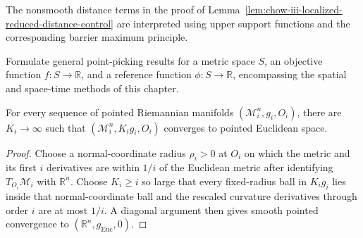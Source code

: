 \begin{remark}
\label{rem:chow-iii-localized-barrier-nonsmoothness}
The nonsmooth distance terms in the proof of
Lemma~\ref{lem:chow-iii-localized-reduced-distance-control} are interpreted
using upper support functions and the corresponding barrier maximum
principle.
\end{remark}

\begin{example}
\label{ex:chow-iii-general-point-picking}
Formulate general point-picking results for a metric space \(S\), an objective
function \(f:S\to\mathbb R\), and a reference function
\(\phi:S\to\mathbb R\), encompassing the spatial and space-time methods of
this chapter.
\end{example}

\begin{example}
\label{ex:chow-iii-trivial-limits-rescaling}
For every sequence of pointed Riemannian manifolds
\((\mathcal M_i^n,g_i,O_i)\), there are \(K_i\to\infty\) such that
\((\mathcal M_i^n,K_ig_i,O_i)\) converges to pointed Euclidean space.
\end{example}
\begin{proof}
Choose a normal-coordinate radius \(\rho_i>0\) at \(O_i\) on which the metric
and its first \(i\) derivatives are within \(1/i\) of the Euclidean metric
after identifying \(T_{O_i}\mathcal M_i\) with \(\mathbb R^n\).  Choose
\(K_i\ge i\) so large that every fixed-radius ball in \(K_ig_i\) lies inside
that normal-coordinate ball and the rescaled curvature derivatives through
order \(i\) are at most \(1/i\).  A diagonal argument then gives smooth
pointed convergence to \((\mathbb R^n,g_{\mathrm{Euc}},0)\).
\end{proof}
